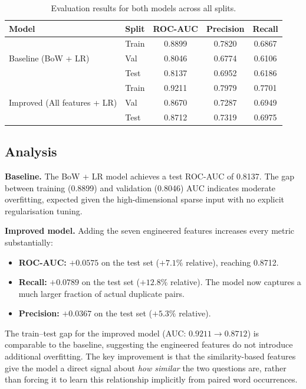\documentclass[11pt,a4paper]{article}
\begin{document}
\begin{table}[h]
\centering
\caption{Evaluation results for both models across all splits.}
\label{tab:results}
\begin{tabular}{llccc}
\toprule
\textbf{Model} & \textbf{Split} & \textbf{ROC-AUC} & \textbf{Precision} & \textbf{Recall} \\
\midrule
\multirow{3}{*}{Baseline (BoW + LR)}
    & Train & 0.8899 & 0.7820 & 0.6867 \\
    & Val   & 0.8046 & 0.6774 & 0.6106 \\
    & Test  & 0.8137 & 0.6952 & 0.6186 \\
\midrule
\multirow{3}{*}{Improved (All features + LR)}
    & Train & 0.9211 & 0.7979 & 0.7701 \\
    & Val   & 0.8670 & 0.7287 & 0.6949 \\
    & Test  & 0.8712 & 0.7319 & 0.6975 \\
\bottomrule
\end{tabular}
\end{table}

\subsection{Analysis}

\textbf{Baseline.} The BoW + LR model achieves a test ROC-AUC of 0.8137. The gap between training (0.8899) and validation (0.8046) AUC indicates moderate overfitting, expected given the high-dimensional sparse input with no explicit regularisation tuning.

\textbf{Improved model.} Adding the seven engineered features increases every metric substantially:

\begin{itemize}[leftmargin=*]
    \item \textbf{ROC-AUC:} $+0.0575$ on the test set ($+7.1\%$ relative), reaching 0.8712.
    \item \textbf{Recall:} $+0.0789$ on the test set ($+12.8\%$ relative). The model now captures a much larger fraction of actual duplicate pairs.
    \item \textbf{Precision:} $+0.0367$ on the test set ($+5.3\%$ relative).
\end{itemize}

The train--test gap for the improved model (AUC: $0.9211 \to 0.8712$) is comparable to the baseline, suggesting the engineered features do not introduce additional overfitting. The key improvement is that the similarity-based features give the model a direct signal about \emph{how similar} the two questions are, rather than forcing it to learn this relationship implicitly from paired word occurrences.
\end{document}
